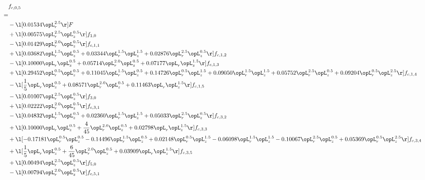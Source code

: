 \begin{alignat}{2} 
\label{eq:f_05_2} 
& f_{c,0,5} \nonumber \\ 
 = \\ 
& - \l[  0.01534 \opL_r^{2.5}  \r] F \nonumber \\ 
& + \l[  0.00575 \opL_r^{2.5} \opL_z^{0.5}  \r] f_{1,0} \nonumber \\ 
& - \l[  0.01429 \opL_r^{2.0} \opL_z^{0.5}  \r] f_{c,1,1} \nonumber \\ 
& + \l[  0.03682 \opL_r^{1.5} \opL_z^{0.5} +  0.03344 \opL_r^{1.5} \opL_z^{1.5} +  0.02876 \opL_r^{2.5} \opL_z^{0.5}  \r] f_{c,1,2} \nonumber \\ 
& - \l[  0.10000 \opL_r \opL_z^{0.5} +  0.05714 \opL_r^{2.0} \opL_z^{0.5} +  0.07177 \opL_r \opL_z^{1.5}  \r] f_{c,1,3} \nonumber \\ 
& + \l[  0.29452 \opL_r^{0.5} \opL_z^{0.5} +  0.11045 \opL_r^{1.5} \opL_z^{0.5} +  0.14726 \opL_r^{0.5} \opL_z^{1.5} +  0.09050 \opL_r^{1.5} \opL_z^{1.5} +  0.05752 \opL_r^{2.5} \opL_z^{0.5} +  0.09204 \opL_r^{0.5} \opL_z^{2.5}  \r] f_{c,1,4} \nonumber \\ 
& - \l[ \frac{1}{5} \opL_r \opL_z^{0.5} +  0.08571 \opL_r^{2.0} \opL_z^{0.5} +  0.11463 \opL_r \opL_z^{1.5}  \r] f_{c,1,5} \nonumber \\ 
& - \l[  0.01007 \opL_r^{2.5} \opL_z^{0.5}  \r] f_{3,0} \nonumber \\ 
& + \l[  0.02222 \opL_r^{2.0} \opL_z^{0.5}  \r] f_{c,3,1} \nonumber \\ 
& - \l[  0.04832 \opL_r^{1.5} \opL_z^{0.5} +  0.02360 \opL_r^{1.5} \opL_z^{1.5} +  0.05033 \opL_r^{2.5} \opL_z^{0.5}  \r] f_{c,3,2} \nonumber \\ 
& + \l[  0.10000 \opL_r \opL_z^{0.5} + \frac{4}{45} \opL_r^{2.0} \opL_z^{0.5} +  0.02798 \opL_r \opL_z^{1.5}  \r] f_{c,3,3} \nonumber \\ 
& + \l[  -0.17181 \opL_r^{0.5} \opL_z^{0.5}   -0.14496 \opL_r^{1.5} \opL_z^{0.5} +  0.02148 \opL_r^{0.5} \opL_z^{1.5}   -0.06098 \opL_r^{1.5} \opL_z^{1.5}   -0.10067 \opL_r^{2.5} \opL_z^{0.5} +  0.05369 \opL_r^{0.5} \opL_z^{2.5}  \r] f_{c,3,4} \nonumber \\ 
& + \l[ \frac{1}{5} \opL_r \opL_z^{0.5} + \frac{6}{45} \opL_r^{2.0} \opL_z^{0.5} +  0.03909 \opL_r \opL_z^{1.5}  \r] f_{c,3,5} \nonumber \\ 
& + \l[  0.00494 \opL_r^{2.5} \opL_z^{0.5}  \r] f_{5,0} \nonumber \\ 
& - \l[  0.00794 \opL_r^{2.0} \opL_z^{0.5}  \r] f_{c,5,1} \nonumber \\ 

\end{alignat}
